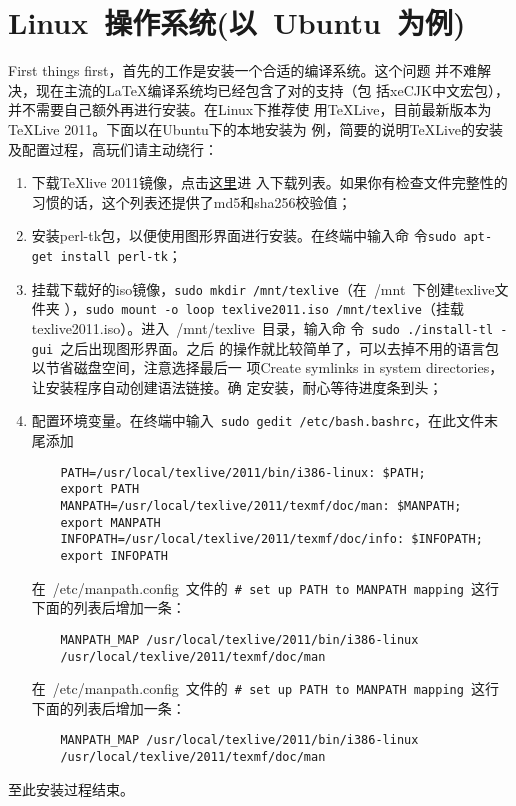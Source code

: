 \section{Linux~操作系统(以~Ubuntu~为例)}
First things first，首先的工作是安装一个合适的\XeTeX{}编译系统。这个问题
并不难解决，现在主流的\LaTeX{}编译系统均已经包含了对\XeTeX{}的支持（包
括xeCJK中文宏包），并不需要自己额外再进行安装。在Linux下推荐使
用\TeX{}Live，目前最新版本为\TeX{}Live 2011。下面以在Ubuntu下的本地安装为
例，简要的说明\TeX{}Live的安装及配置过程，高玩们请主动绕行：

\begin{enumerate}
\item 下载\TeX{}live 2011镜像，点击\href{http://ftp.ctex.org/mirrors/CTAN/systems/texlive/Images/}{这里}进
  入下载列表。如果你有检查文件完整性的习惯的话，这个列表还提供了md5和sha256校验值；
\item 安装perl-tk包，以便使用图形界面进行安装。在终端中输入命
  令\texttt{\footnotesize sudo apt-get install perl-tk}；
\item 挂载下载好的iso镜像，\texttt{\footnotesize sudo mkdir
    /mnt/texlive}（在~{/mnt}~下创建texlive文件夹
  ），\texttt{\footnotesize sudo mount -o loop texlive2011.iso
    /mnt/texlive}（挂载texlive2011.iso）。进入~/mnt/texlive~目录，输入命
  令~\texttt{\footnotesize sudo ./install-tl -gui}~之后出现图形界面。之后
  的操作就比较简单了，可以去掉不用的语言包以节省磁盘空间，注意选择最后一
  项Create symlinks in system directories，让安装程序自动创建语法链接。确
  定安装，耐心等待进度条到头；
\item 配置环境变量。在终端中输入~\texttt{\footnotesize sudo gedit
    /etc/bash.bashrc}，在此文件末尾添加

  \begin{lstlisting}
    PATH=/usr/local/texlive/2011/bin/i386-linux: $PATH;
    export PATH
    MANPATH=/usr/local/texlive/2011/texmf/doc/man: $MANPATH;
    export MANPATH
    INFOPATH=/usr/local/texlive/2011/texmf/doc/info: $INFOPATH;
    export INFOPATH
  \end{lstlisting}

  在~{/etc/manpath.config}~文件的~\texttt{\footnotesize\# set up PATH to
    MANPATH mapping}~这行下面的列表后增加一条：
  \begin{lstlisting}
    MANPATH_MAP /usr/local/texlive/2011/bin/i386-linux
    /usr/local/texlive/2011/texmf/doc/man
  \end{lstlisting}

  在~{/etc/manpath.config}~文件的~\texttt{\footnotesize\# set up PATH to
    MANPATH mapping}~这行下面的列表后增加一条：
  \begin{lstlisting}
    MANPATH_MAP /usr/local/texlive/2011/bin/i386-linux
    /usr/local/texlive/2011/texmf/doc/man
  \end{lstlisting}
\end{enumerate}
至此安装过程结束。

